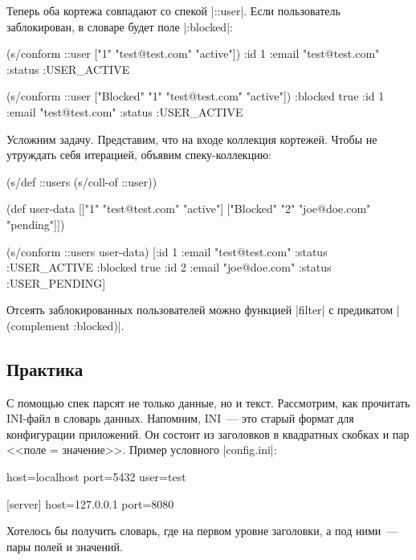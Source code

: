 Теперь оба кортежа совпадают со спекой \spverb|::user|. Если пользователь
заблокирован, в словаре будет поле \spverb|:blocked|:

\begin{english}
  \begin{clojure}
(s/conform ::user ["1" "test@test.com" "active"])
{:id 1 :email "test@test.com" :status :USER_ACTIVE}

(s/conform ::user ["Blocked" "1" "test@test.com" "active"])
{:blocked true :id 1 :email "test@test.com" :status :USER_ACTIVE}
  \end{clojure}
\end{english}

Усложним задачу. Представим, что на входе коллекция кортежей. Чтобы не утруждать
себя итерацией, объявим спеку-коллекцию:

\begin{english}
  \begin{clojure}
(s/def ::users (s/coll-of ::user))

(def user-data
  [["1" "test@test.com" "active"]
   ["Blocked" "2" "joe@doe.com" "pending"]])

(s/conform ::users user-data)
[{:id 1 :email "test@test.com" :status :USER_ACTIVE}
 {:blocked true :id 2 :email "joe@doe.com" :status :USER_PENDING}]
  \end{clojure}
\end{english}

Отсеять заблокированных пользователей можно функцией \spverb|filter| с
предикатом \spverb|(complement :blocked)|.

\subsection{Практика}

С помощью спек парсят не только данные, но и текст. Рассмотрим, как прочитать
INI-файл в словарь данных. Напомним, INI~--- это старый формат для конфигурации
приложений. Он состоит из заголовков в квадратных скобках и пар <<поле =
значение>>. Пример условного \spverb|config.ini|:

\begin{english}
  \begin{ini}
[database]
host=localhost
port=5432
user=test

[server]
host=127.0.0.1
port=8080
  \end{ini}
\end{english}

Хотелось бы получить словарь, где на первом уровне заголовки, а под ними~---
пары полей и значений.

